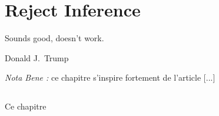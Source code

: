 \chapter{Reject Inference} \label{chap2}

\epigraph{Sounds good, doesn't work.}{Donald J.\ Trump}


\textit{Nota Bene :} ce chapitre s'inspire fortement de l'article [...]

\section{}



\bigskip

Ce chapitre

\printbibliography[heading=subbibliography, title=Références du chapitre 2]